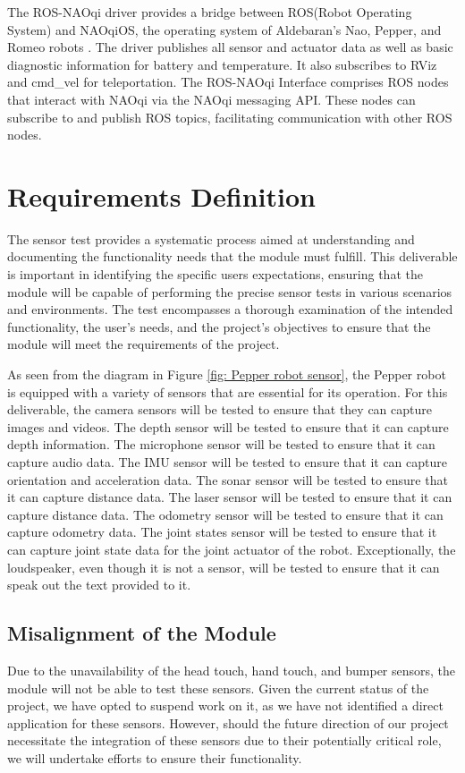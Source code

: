 \documentclass{CSSRforAfrica}
\begin{document}
The ROS-NAOqi driver provides a bridge between ROS(Robot Operating System) and NAOqiOS, 
the operating system of Aldebaran's Nao, Pepper, and Romeo robots \cite{SoftBankDocumentation}. 
The driver publishes all sensor and actuator data as well as basic diagnostic information 
for battery and temperature. It also subscribes to RViz and cmd\_vel for teleportation. 
The ROS-NAOqi Interface comprises ROS nodes that interact with NAOqi via the NAOqi messaging 
API. These nodes can subscribe to and publish ROS topics, facilitating communication 
with other ROS nodes.

\newpage

\section{Requirements Definition}
The sensor test provides a systematic process aimed at understanding and documenting the
functionality needs that the module must fulfill. This deliverable is important in identifying 
the specific users expectations, ensuring that the module will be capable of performing the precise
sensor tests in various scenarios and environments. The test encompasses a thorough examination of the 
intended functionality, the user's needs, and the project's objectives to ensure that the module 
will meet the requirements of the project. 

As seen from the diagram in Figure \ref{fig: Pepper robot sensor}, the Pepper robot is equipped with
a variety of sensors that are essential for its operation. For this deliverable,
the camera sensors will be tested to ensure that they can capture images and videos. 
The depth sensor will be tested to ensure that it can capture depth information. The 
microphone sensor will be tested to ensure that it can capture audio data. The IMU sensor 
will be tested to ensure that it can capture orientation and acceleration data. The sonar 
sensor will be tested to ensure that it can capture distance data. The laser sensor will 
be tested to ensure that it can capture distance data. The odometry sensor will be tested 
to ensure that it can capture odometry data. The joint states sensor will be tested to 
ensure that it can capture joint state data for the joint actuator of the robot. 
Exceptionally, the loudspeaker, even though it is not a sensor, will be tested to ensure that it
can speak out the text provided to it.

\subsection*{Misalignment of the Module}
Due to the unavailability of the head touch, hand touch, and bumper sensors, the module will not 
be able to test these sensors. Given the current status of the project, we have opted to suspend 
work on it, as we have not identified a direct application for these sensors. However, should the
future direction of our project necessitate the integration of these sensors due to their potentially
critical role, we will undertake efforts to ensure their functionality.
\end{document}

